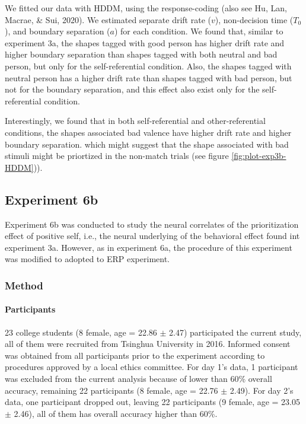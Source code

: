 \documentclass[
  english,
  man]{apa6}
\let\oldparagraph\paragraph
\renewcommand{\paragraph}[1]{\oldparagraph{#1}\mbox{}}
\begin{document}
We fitted our data with HDDM, using the response-coding (also see Hu, Lan, Macrae, \& Sui, 2020). We estimated separate drift rate (\(v\)), non-decision time (\(T_{0}\)), and boundary separation (\(a\)) for each condition. We found that, similar to experiment 3a, the shapes tagged with good person has higher drift rate and higher boundary separation than shapes tagged with both neutral and bad person, but only for the self-referential condition. Also, the shapes tagged with neutral person has a higher drift rate than shapes tagged with bad person, but not for the boundary separation, and this effect also exist only for the self-referential condition.

Interestingly, we found that in both self-referential and other-referential conditions, the shapes associated bad valence have higher drift rate and higher boundary separation. which might suggest that the shape associated with bad stimuli might be priortized in the non-match trials (see figure \ref{fig:plot-exp3b-HDDM})).

\hypertarget{experiment-6b}{%
\subsection{Experiment 6b}\label{experiment-6b}}

Experiment 6b was conducted to study the neural correlates of the prioritization effect of positive self, i.e., the neural underlying of the behavioral effect found int experiment 3a. However, as in experiment 6a, the procedure of this experiment was modified to adopted to ERP experiment.

\hypertarget{method-5}{%
\subsubsection{Method}\label{method-5}}

\hypertarget{participants-7}{%
\paragraph{Participants}\label{participants-7}}

23 college students (8 female, age = 22.86 \(\pm\) 2.47) participated the current study, all of them were recruited from Tsinghua University in 2016. Informed consent was obtained from all participants prior to the experiment according to procedures approved by a local ethics committee. For day 1's data, 1 participant was excluded from the current analysis because of lower than 60\% overall accuracy, remaining 22 participants (8 female, age = 22.76 \(\pm\) 2.49). For day 2's data, one participant dropped out, leaving 22 participants (9 female, age = 23.05 \(\pm\) 2.46), all of them has overall accuracy higher than 60\%.
\end{document}
